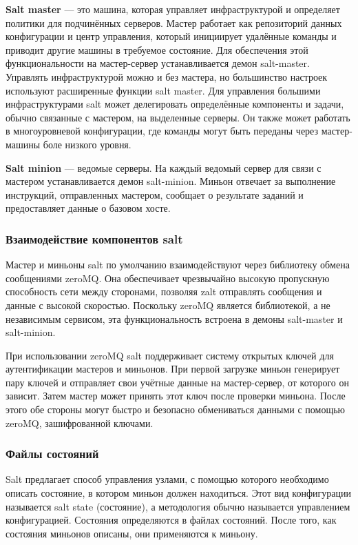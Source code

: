 \documentclass[a4paper]{extarticle}
\begin{document}
\bigbreak

\textbf{Salt master} --- это машина, которая управляет инфраструктурой и определяет политики для подчинённых серверов. Мастер работает как репозиторий данных конфигурации и центр управления, который инициирует удалённые команды и приводит другие машины в требуемое состояние. Для обеспечения этой функциональности на мастер-сервер устанавливается демон salt-master. Управлять инфраструктурой можно и без мастера, но большинство настроек используют расширенные функции salt master. Для управления большими инфраструктурами salt может делегировать определённые компоненты и задачи, обычно связанные с мастером, на выделенные серверы. Он также может работать в многоуровневой конфигурации, где команды могут быть переданы через мастер-машины боле низкого уровня.

\bigbreak

\textbf{Salt minion} --- ведомые серверы. На каждый ведомый сервер для связи с мастером устанавливается демон salt-minion. Миньон отвечает за выполнение инструкций, отправленных мастером, сообщает о результате заданий и предоставляет данные о базовом хосте.

\subsubsection{Взаимодействие компонентов salt}

Мастер и миньоны salt по умолчанию взаимодействуют через библиотеку обмена сообщениями zeroMQ. Она обеспечивает чрезвычайно высокую пропускную способность сети между сторонами, позволяя zalt отправлять сообщения и данные с высокой скоростью. Поскольку zeroMQ является библиотекой, а не независимым сервисом, эта функциональность встроена в демоны salt-master и salt-minion.

При использовании zeroMQ salt поддерживает систему открытых ключей для аутентификации мастеров и миньонов. При первой загрузке миньон генерирует пару ключей и отправляет свои учётные данные на мастер-сервер, от которого он зависит. Затем мастер может принять этот ключ после проверки миньона. После этого обе стороны могут быстро и безопасно обмениваться данными с помощью zeroMQ, зашифрованной ключами.

\subsubsection{Файлы состояний}

Salt предлагает способ управления узлами, с помощью которого необходимо описать состояние, в котором миньон должен находиться. Этот вид конфигурации называется salt state (состояние), а методология обычно называется управлением конфигурацией. Состояния определяются в файлах состояний. После того, как состояния миньонов описаны, они применяются к миньону.
\end{document}
